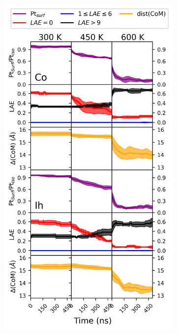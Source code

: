 \begin{figure}
     \centering
     \begin{subfigure}[b]{0.31\textwidth}
         \centering
         \includegraphics[width=\textwidth]{figures/MD/Coal/891.png}
         \caption{}
         \label{fig:MD_Coal_891}
     \end{subfigure}

\end{figure}
